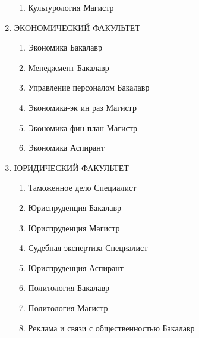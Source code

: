 \begin{enumerate}
\begin{enumerate}
\item Культурология	Магистр
\end{enumerate}
\item ЭКОНОМИЧЕСКИЙ ФАКУЛЬТЕТ
\begin{enumerate}
\item Экономика	Бакалавр
\item Менеджмент	Бакалавр
\item Управление персоналом	Бакалавр
\item Экономика-эк ин раз	Магистр
\item Экономика-фин план	Магистр
\item Экономика	Аспирант
\end{enumerate}
\item ЮРИДИЧЕСКИЙ ФАКУЛЬТЕТ
\begin{enumerate}
\item Таможенное дело	Специалист
\item Юриспруденция	Бакалавр
\item Юриспруденция	Магистр
\item Судебная экспертиза	Специалист
\item Юриспруденция	Аспирант
\item Политология	Бакалавр
\item Политология	Магистр
\item Реклама и связи с общественностью	Бакалавр
\end{enumerate}
\end{enumerate}